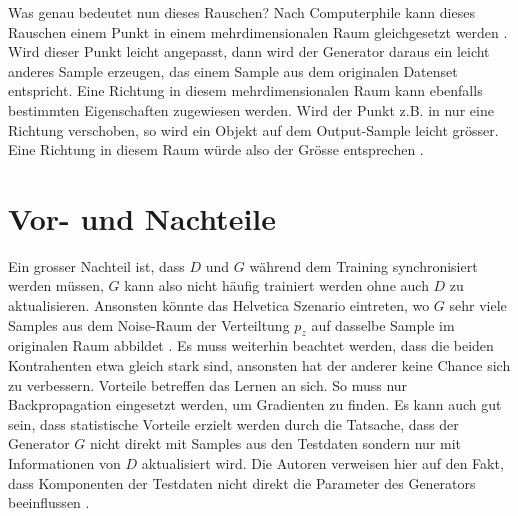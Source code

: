 \para
Was genau bedeutet nun dieses Rauschen? Nach \glqq Computerphile\grqq{} kann dieses Rauschen einem Punkt in einem
mehrdimensionalen Raum gleichgesetzt werden \cite[~t 16:45]{youtube:gan}. Wird dieser Punkt leicht angepasst, dann
wird der Generator daraus ein leicht anderes Sample erzeugen, das einem Sample aus dem originalen Datenset entspricht.
Eine Richtung in diesem mehrdimensionalen Raum kann ebenfalls bestimmten Eigenschaften zugewiesen werden. Wird der Punkt
z.B. in nur eine Richtung verschoben, so wird ein Objekt auf dem Output-Sample leicht grösser. Eine
Richtung in diesem Raum würde also der Grösse entsprechen \cite[~t 17:35]{youtube:gan}.

\section{Vor- und Nachteile}
Ein grosser Nachteil ist, dass $D$ und $G$ während dem Training synchronisiert werden müssen, $G$ kann also nicht
häufig trainiert werden ohne auch $D$ zu aktualisieren. Ansonsten könnte das \glqq Helvetica Szenario\grqq{} eintreten,
wo $G$ sehr viele Samples aus dem Noise-Raum der Verteiltung $p_z$ auf dasselbe Sample im originalen Raum abbildet \cite{8253599}.
Es muss weiterhin beachtet werden, dass die beiden Kontrahenten etwa gleich stark sind, ansonsten hat der anderer keine
Chance sich zu verbessern.
\para
Vorteile betreffen das Lernen an sich. So muss nur \Gls{Backpropagation} eingesetzt werden, um Gradienten zu finden.
Es kann auch gut sein, dass statistische Vorteile erzielt werden durch die Tatsache, dass der Generator $G$ nicht direkt
mit Samples aus den Testdaten sondern nur mit Informationen von $D$ aktualisiert wird. Die Autoren verweisen hier auf
den Fakt, dass Komponenten der Testdaten nicht direkt die Parameter des Generators beeinflussen \cite{8253599}.